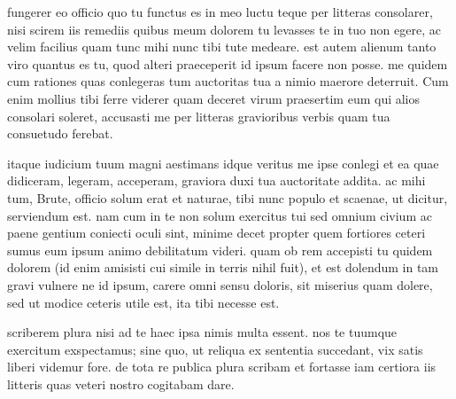 


 fungerer eo officio quo tu functus es in meo luctu teque per litteras consolarer, nisi scirem iis remediis quibus meum dolorem tu levasses te in tuo non egere, ac velim facilius quam tunc mihi nunc tibi tute medeare. est autem alienum tanto viro quantus es tu, quod alteri praeceperit id ipsum facere non posse. me quidem cum rationes quas conlegeras tum auctoritas tua a nimio maerore deterruit. Cum enim mollius tibi ferre viderer quam deceret virum praesertim eum qui alios consolari soleret, accusasti me per litteras gravioribus verbis quam tua consuetudo ferebat.

 itaque iudicium tuum magni aestimans idque veritus me ipse conlegi et ea quae didiceram, legeram, acceperam, graviora duxi tua auctoritate addita. ac mihi tum, Brute, officio solum erat et naturae, tibi nunc populo et scaenae, ut dicitur, serviendum est. nam cum in te non solum exercitus tui sed omnium civium ac paene gentium coniecti oculi sint, minime decet propter quem fortiores ceteri sumus eum ipsum animo debilitatum videri. quam ob rem accepisti tu quidem dolorem (id enim amisisti cui simile in terris nihil fuit), et est dolendum in tam gravi vulnere ne id ipsum, carere omni sensu doloris, sit miserius quam dolere, sed ut modice ceteris utile est, ita tibi necesse est.

 scriberem plura nisi ad te haec ipsa nimis multa essent. nos te tuumque exercitum exspectamus; sine quo, ut reliqua ex sententia succedant, vix satis liberi videmur fore. de tota re publica plura scribam et fortasse iam certiora iis litteris quas veteri nostro cogitabam dare.
